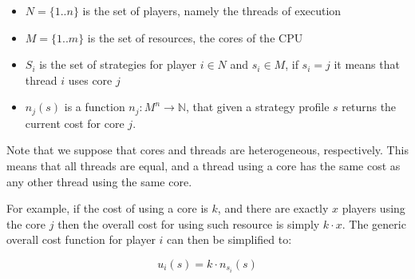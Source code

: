 \begin{itemize}
\item
  \(N = \{1..n\}\) is the set of players, namely the threads of
  execution
\item
  \(M = \{1..m\}\) is the set of resources, the cores of the CPU
\item
  \(S_i\) is the set of strategies for player \(i\in N\) and
  \(s_i\in M\), if \(s_i = j\) it means that thread \(i\) uses core
  \(j\)
\item
  \(n_j(s)\) is a function \(n_j:M^n\rightarrow\mathbb{N}\), that given
  a strategy profile \(s\) returns the current cost for core \(j\).
\end{itemize}

Note that we suppose that cores and threads are heterogeneous,
respectively. This means that all threads are equal, and a thread using
a core has the same cost as any other thread using the same core.

For example, if the cost of using a core is \(k\), and there are exactly
\(x\) players using the core \(j\) then the overall cost for using such
resource is simply \(k \cdot x\). The generic overall cost function for
player \(i\) can then be simplified to:

\[ u_i(s)= k \cdot n_{s_i}(s) \]

